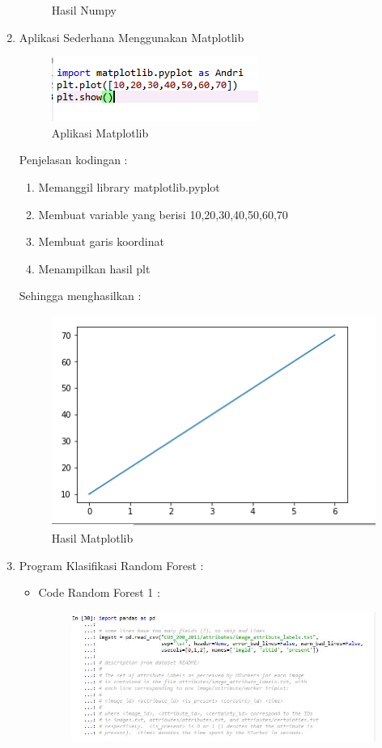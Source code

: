 \begin{enumerate}
\begin{figure}[ht]
	\caption{Hasil Numpy}
	\label{contoh}
	\end{figure}
\item Aplikasi Sederhana Menggunakan Matplotlib
	\begin{figure}[ht]
	\centering
	\includegraphics[scale=0.5]{figures/AFS/praktek5.png}
	\caption{Aplikasi Matplotlib}
	\label{contoh}
	\end{figure}
	\par Penjelasan kodingan :
		\begin{enumerate}
		\item Memanggil library matplotlib.pyplot
		\item Membuat variable yang berisi 10,20,30,40,50,60,70
		\item Membuat garis koordinat
		\item Menampilkan hasil plt
		\end{enumerate}
	\par Sehingga menghasilkan :
	\begin{figure}[ht]
	\centering
	\includegraphics[scale=0.5]{figures/AFS/praktek6.png}
	\caption{Hasil Matplotlib}
	\label{contoh}
	\end{figure}
\par
\par
\item Program Klasifikasi Random Forest :
\begin{itemize}
\item Code Random Forest 1 :
\par
\begin{figure}[ht]
\centering
\includegraphics[scale=0.7]{figures/AFS/4a.jpg}

\end{figure}
\end{itemize}
\end{enumerate}
